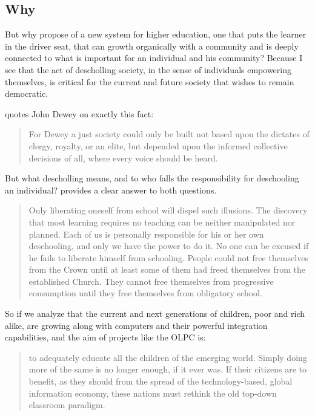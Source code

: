 \subsection{Why}

But why propose of a new system for higher education, one that puts the learner
in the driver seat, that can growth organically with a community and is deeply
connected to what is important for an individual and his community? Because I see that the act of
descholling society, in the sense of individuals empowering themselves, is
critical for the current and future society that wishes to remain democratic.

\cite{education:cavallo__models_of_growth} quotes John Dewey on exactly this fact:
\begin{quote}
For Dewey a just society could only be built not based upon the dictates of
clergy, royalty, or an elite, but depended upon the informed collective
decisions of all, where every voice should be heard.
\end{quote}

But what descholling means, and to who falls the responsibility for deschooling
an individual? \cite{education:ivan_illich__deschooling_society} provides a
clear answer to both questions.

\begin{quotation}
  Only liberating oneself from school will dispel such illusions. The discovery
  that most learning requires no teaching can be neither manipulated nor planned.
  Each of us is personally responsible for his or her own deschooling, and only we
  have the power to do it. No one can be excused if he fails to liberate himself
  from schooling. People could not free themselves from the Crown until at least
  some of them had freed themselves from the established Church. They cannot free
  themselves from progressive consumption until they free themselves from
  obligatory school.
\end{quotation}

So if we analyze that the current and next generations of children, poor and rich alike, are
growing along with computers and their powerful integration capabilities, and
the aim of projects like the OLPC is: 

\begin{quote}
    to adequately educate all the children of the
    emerging world. Simply doing more of the same is no longer enough, if it
    ever was. If their citizens are to benefit, as they should from the spread
    of the technology-based, global information economy, these nations must
    rethink the old top-down classroom paradigm. 
    \cite{education:olpc_educational_proposition}
\end{quote}

